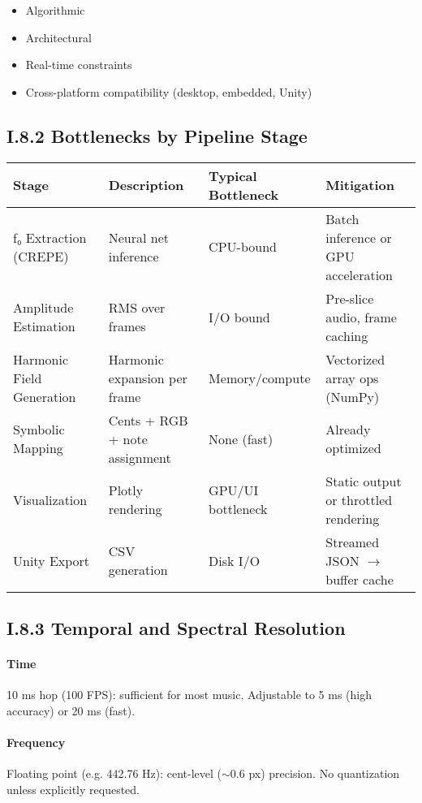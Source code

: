 \begin{itemize}
    \item Algorithmic
    \item Architectural
    \item Real-time constraints
    \item Cross-platform compatibility (desktop, embedded, Unity)
\end{itemize}

\subsection*{I.8.2 Bottlenecks by Pipeline Stage}

\begin{center}
\begin{tabular}{|l|p{4.2cm}|p{3.2cm}|p{4.2cm}|}
\hline
\textbf{Stage} & \textbf{Description} & \textbf{Typical Bottleneck} & \textbf{Mitigation} \\
\hline
f₀ Extraction (CREPE) & Neural net inference & CPU-bound & Batch inference or GPU acceleration \\
Amplitude Estimation & RMS over frames & I/O bound & Pre-slice audio, frame caching \\
Harmonic Field Generation & Harmonic expansion per frame & Memory/compute & Vectorized array ops (NumPy) \\
Symbolic Mapping & Cents + RGB + note assignment & None (fast) & Already optimized \\
Visualization & Plotly rendering & GPU/UI bottleneck & Static output or throttled rendering \\
Unity Export & CSV generation & Disk I/O & Streamed JSON $\rightarrow$ buffer cache \\
\hline
\end{tabular}
\end{center}

\subsection*{I.8.3 Temporal and Spectral Resolution}

\paragraph{Time} 10 ms hop (100 FPS): sufficient for most music. Adjustable to 5 ms (high accuracy) or 20 ms (fast).

\paragraph{Frequency} Floating point (e.g. 442.76 Hz): cent-level ($\sim$0.6 px) precision. No quantization unless explicitly requested.

